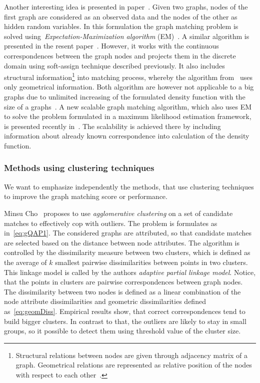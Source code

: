 Another interesting idea is presented in paper~\cite{Hancock_EM_SVD}. Given two graphs, nodes of the first graph are considered as an observed data and the nodes of the other as hidden random variables. In this formulation the graph matching problem is solved using~\emph{Expectation-Maximization algorithm} (EM)~\cite{EM_Dempster1977}. A similar algorithm is presented in the resent paper~\cite{Sanrom2012}. However, it works with the continuous correspondences between the graph nodes and projects them in the discrete domain using soft-assign technique described previously. It also includes structural information\footnote{Structural relations between nodes are given through adjacency matrix of a graph. Geometrical relations are represented as relative position of the nodes with respect to each other~\cite{Sanrom2012}.} into matching process, whereby the algorithm from~\cite{Hancock_EM_SVD} uses only geometrical information. Both algorithm are however not applicable to a big graphs due to unlimited increasing of the formulated density function with the size of a graphs~\cite{Armiti2014}. A new scalable graph matching algorithm, which also uses EM to solve the problem formulated in a maximum likelihood estimation framework, is presented recently in~\cite{Armiti2014}. The scalability is achieved there by including information about already known correspondence into calculation of the density function.
\subsubsection{Methods using clustering techniques}
We want to emphasize independently the methods, that use clustering techniques to improve the graph matching score or performance.

Minsu Cho~\cite{Cho2009_AgglClustering} proposes to use \emph{agglomerative clustering} on a set of candidate matches to effectively cop with outliers. The problem is formulates as in~\eqref{eq:gQAP1}. The considered graphs are attributed, so that candidate matches are selected based on the distance between node attributes. The algorithm is controlled by the dissimilarity measure between two clusters, which is defined as the average of $k$ smallest pairwise dissimilarities between points in two clusters. This linkage model is called by the authors \emph{adaptive partial linkage model}. Notice, that the points in clusters are pairwise correspondences between graph nodes. The dissimilarity between two nodes is defined as a linear combination of the node attribute dissimilarities and 
geometric dissimilarities defined as~\eqref{eq:geomDiss}. Empirical results show, that correct correspondences tend to build bigger clusters. In contrast to that, the outliers are likely to stay in small groups, so it possible to detect them using threshold value of the cluster size.

